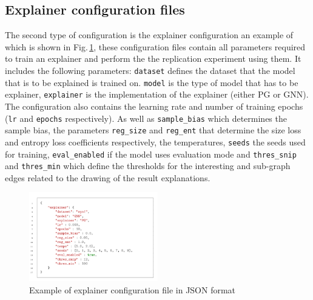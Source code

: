 \subsection{Explainer configuration files}
The second type of configuration is the explainer configuration an example of which is shown in Fig.\,\ref{fig:explainer-config-example}, these configuration files contain all parameters required to train an explainer and perform the the replication experiment using them. It includes the following parameters: \texttt{dataset} defines the dataset that the model that is to be explained is trained on. \texttt{model} is the type of model that has to be explainer, \texttt{explainer} is the implementation of the explainer (either PG or GNN). The configuration also contains the learning rate  and number of training epochs (\texttt{lr} and \texttt{epochs} respectively). As well as \texttt{sample\_bias} which determines the sample bias, the parameters \texttt{reg\_size} and \texttt{reg\_ent} that determine the size loss and entropy loss coefficients respectively, the temperatures, \texttt{seeds} the seeds used for training, \texttt{eval\_enabled} if the model uses evaluation mode and \texttt{thres\_snip} and \texttt{thres\_min} which define the thresholds for the interesting and sub-graph edges related to the drawing of the result explanations.  
\begin{figure}[h!]
    \centering
    \includegraphics[width=0.5\textwidth]{imgs/config-examples/explainer-config-example.png}
    \caption{Example of explainer configuration file in JSON format} 
\label{fig:explainer-config-example}
\end{figure}